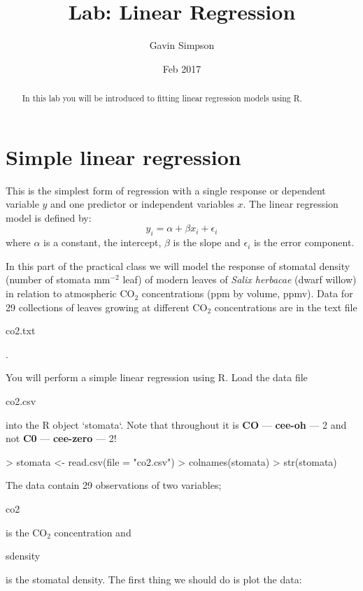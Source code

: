 \documentclass[letterpaper,10pt]{article}
\newcommand{\R}{\textsf{R}\xspace}
\newenvironment{rline}{\begin{small}\begin{ttfamily}}{\end{ttfamily}\end{small}}
\begin{document}
\title{Lab: Linear Regression}
\author{Gavin Simpson}
\date{Feb 2017}
\maketitle

\begin{abstract}
In this lab you will be introduced to fitting linear regression models using \R.
\end{abstract}

\section{Simple linear regression}
This is the simplest form of regression with a single response or dependent variable $y$ and one predictor or independent variables $x$. The linear regression model is defined by:
\begin{displaymath}
    y_i=\alpha+\beta x_i+\epsilon_i
\end{displaymath}
where $\alpha$ is a constant, the intercept, $\beta$ is the slope and $\epsilon_i$ is the error component.

In this part of the practical class we will model the response of stomatal density (number of stomata $\mathrm{mm}^{-2}$ leaf) of modern leaves of \textit{Salix herbacae} (dwarf willow) in relation to atmospheric $\mathrm{CO}_2$ concentrations (ppm by volume, ppmv). Data for 29 collections of leaves growing at different $\mathrm{CO}_2$ concentrations are in the text file \begin{rline}co2.txt\end{rline}.

You will perform a simple linear regression using \R. Load the data file \begin{rline}co2.csv\end{rline} into the R object `stomata`. Note that throughout it is \textbf{CO} --- \textbf{cee-oh} --- 2 and not \textbf{C0} --- \textbf{cee-zero} --- 2!


\begin{Schunk}
\begin{Sinput}
> stomata <- read.csv(file = "co2.csv")
> colnames(stomata)
> str(stomata)
\end{Sinput}
\end{Schunk}

The data contain 29 observations of two variables; \begin{rline}co2\end{rline} is the $\mathrm{CO}_2$ concentration and \begin{rline}sdensity\end{rline} is the stomatal density. The first thing we should do is plot the data:
\end{document}
